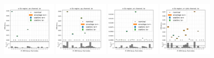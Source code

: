 \begin{figure}
    \includegraphics[width=0.24\textwidth]{appendices/ttSystReweighting/figures/afterCorr/icata2_ch0_isr.png}
    \includegraphics[width=0.24\textwidth]{appendices/ttSystReweighting/figures/afterCorr/icata2_ch1_isr.png}
    \includegraphics[width=0.24\textwidth]{appendices/ttSystReweighting/figures/afterCorr/icata2_ch2_isr.png}
    \includegraphics[width=0.24\textwidth]{appendices/ttSystReweighting/figures/afterCorr/icata2_ch3_isr.png}


\end{figure}
